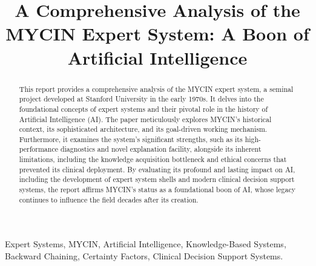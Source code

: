 \documentclass[conference]{IEEEtran}
\begin{document}
\title{A Comprehensive Analysis of the MYCIN Expert System: A Boon of Artificial Intelligence
}

\author{
}

\maketitle

\begin{abstract}
This report provides a comprehensive analysis of the MYCIN expert system, a seminal project developed at Stanford University in the early 1970s. It delves into the foundational concepts of expert systems and their pivotal role in the history of Artificial Intelligence (AI). The paper meticulously explores MYCIN's historical context, its sophisticated architecture, and its goal-driven working mechanism. Furthermore, it examines the system's significant strengths, such as its high-performance diagnostics and novel explanation facility, alongside its inherent limitations, including the knowledge acquisition bottleneck and ethical concerns that prevented its clinical deployment. By evaluating its profound and lasting impact on AI, including the development of expert system shells and modern clinical decision support systems, the report affirms MYCIN's status as a foundational boon of AI, whose legacy continues to influence the field decades after its creation.
\end{abstract}

\begin{IEEEkeywords}
Expert Systems, MYCIN, Artificial Intelligence, Knowledge-Based Systems, Backward Chaining, Certainty Factors, Clinical Decision Support Systems.
\end{IEEEkeywords}
\end{document}
